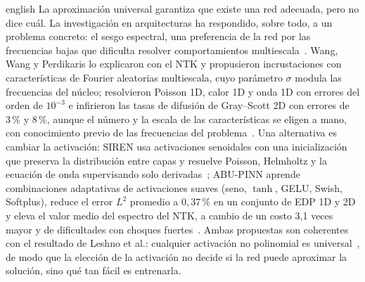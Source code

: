 \documentclass[../0000.tex]{subfiles}
\begin{document}
\begin{hyphenrules}{english}
La aproximación universal garantiza que existe una red adecuada, pero no dice cuál. La investigación en arquitecturas ha respondido, sobre todo, a un problema concreto: el sesgo espectral, una preferencia de la red por las frecuencias bajas que dificulta resolver comportamientos multiescala~\cite{cuomo2022scientific}. Wang, Wang y Perdikaris lo explicaron con el NTK y propusieron incrustaciones con características de Fourier aleatorias multiescala, cuyo parámetro $\sigma$ modula las frecuencias del núcleo; resolvieron Poisson 1D, calor 1D y onda 1D con errores del orden de $10^{-3}$ e infirieron las tasas de difusión de Gray--Scott 2D con errores de $3\,\%$ y $8\,\%$, aunque el número y la escala de las características se eligen a mano, con conocimiento previo de las frecuencias del problema~\cite{wang2021eigenvector}. Una alternativa es cambiar la activación: SIREN usa activaciones senoidales con una inicialización que preserva la distribución entre capas y resuelve Poisson, Helmholtz y la ecuación de onda supervisando solo derivadas~\cite{sitzmann2020implicit}; ABU-PINN aprende combinaciones adaptativas de activaciones suaves (seno, $\tanh$, GELU, Swish, Softplus), reduce el error $L^2$ promedio a $0{,}37\,\%$ en un conjunto de EDP 1D y 2D y eleva el valor medio del espectro del NTK, a cambio de un costo 3,1 veces mayor y de dificultades con choques fuertes~\cite{wang2023learning}. Ambas propuestas son coherentes con el resultado de Leshno et al.: cualquier activación no polinomial es universal~\cite{leshno1993multilayer}, de modo que la elección de la activación no decide si la red puede aproximar la solución, sino qué tan fácil es entrenarla.


\end{hyphenrules}
\end{document}
